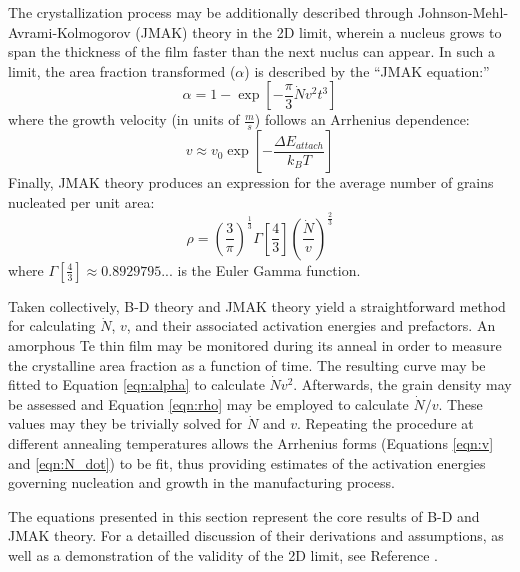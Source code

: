 The crystallization process may be additionally described through Johnson-Mehl-Avrami-Kolmogorov (JMAK) theory in the 2D limit, wherein a nucleus grows to span the thickness of the film faster than the next nuclus can appear.\cite{chrzan:2020}  In such a limit, the area fraction transformed ($\alpha$) is described by the ``JMAK equation:''
%
	\begin{equation}
		\alpha = 1 - \exp
		\left[ -\frac{\pi}{3}\dot{N}v^2t^3 \right]
	\label{eqn:alpha}
	\end{equation}
%
where the growth velocity (in units of $\frac{m}{s}$) follows an Arrhenius dependence:
%
	\begin{equation}
		v \approx v_0 \exp \left[ - \frac{\Delta E_{attach}}{k_B T} \right]
	\label{eqn:v}
	\end{equation}
%
Finally, JMAK theory produces an expression for the average number of grains nucleated per unit area:
%
	\begin{equation}
		\rho = \left(\frac{3}{\pi}\right)^{\frac{1}{3}}
		\Gamma \left[ \frac{4}{3} \right]
		\left( \frac{\dot{N}}{v} \right)^{\frac{2}{3}}
	\label{eqn:rho}
	\end{equation}
%
where $\Gamma \left[ \frac{4}{3} \right] \approx 0.8929795...$ is the Euler Gamma function.

Taken collectively, B-D theory and JMAK theory yield a straightforward method for calculating $\dot{N}$, $v$, and their associated activation energies and prefactors.  An amorphous Te thin film may be monitored during its anneal in order to measure the crystalline area fraction as a function of time.  The resulting curve may be fitted to Equation \ref{eqn:alpha} to calculate $\dot{N}v^2$.  Afterwards, the grain density may be assessed and Equation \ref{eqn:rho} may be employed to calculate $\dot{N}/v$.  These values may they be trivially solved for $\dot{N}$ and ${v}$.  Repeating the procedure at different annealing temperatures allows the Arrhenius forms (Equations \ref{eqn:v} and \ref{eqn:N_dot}) to be fit, thus providing estimates of the activation energies governing nucleation and growth in the manufacturing process.\cite{chrzan:2020}

The equations presented in this section represent the core results of B-D and JMAK theory.  For a detailled discussion of their derivations and assumptions, as well as a demonstration of the validity of the 2D limit, see Reference \cite{chrzan:2020}.
